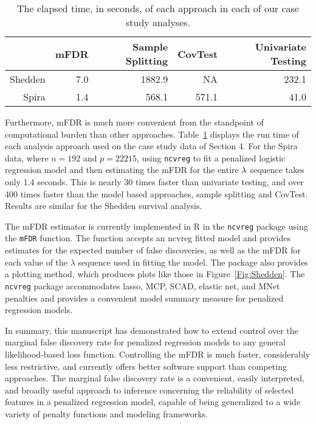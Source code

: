 \begin{table}[ht]
 \caption{\label{Tab:time} The elapsed time, in seconds, of each approach in each of our case study analyses.}
\centering
\begin{tabular}{rrrrr}
  \hline
 & mFDR & Sample Splitting & CovTest & Univariate Testing \\ 
  \hline
	Shedden & 7.0 & 1882.9 & NA & 232.1 \\
Spira & 1.4 & 568.1 & 571.1 & 41.0 \\ 
   \hline
\end{tabular}
\end{table}

Furthermore, mFDR is much more convenient from the standpoint of computational burden than other approaches.  Table~\ref{Tab:time} displays the run time of each analysis approach used on the case study data of Section 4. For the Spira data, where $n = 192$ and $p =22215$, using {\tt ncvreg} to fit a penalized logistic regression model and then estimating the mFDR for the entire $\lambda$ sequence takes only 1.4 seconds. This is nearly 30 times faster than univariate testing, and over 400 times faster than the model based approaches, sample splitting and CovTest.  Results are similar for the Shedden survival analysis.

The mFDR estimator is currently implemented in R in the {\tt ncvreg} package \citep{Breheny2011} using the {\tt mFDR} function. The function accepts an ncvreg fitted model and provides estimates for the expected number of false discoveries, as well as the mFDR for each value of the $\lambda$ sequence used in fitting the model.  The package also provides a plotting method, which produces plots like those in Figure~\ref{Fig:Shedden}.  The {\tt ncvreg} package accommodates lasso, MCP, SCAD, elastic net, and MNet \citep{Huang2016} penalties and provides a convenient model summary measure for penalized regression models.

In summary, this manuscript has demonstrated how to extend control over the marginal false discovery rate for penalized regression models to any general likelihood-based loss function.  Controlling the mFDR is much faster, considerably less restrictive, and currently offers better software support than competing approaches.  The marginal false discovery rate is a convenient, easily interpreted, and broadly useful approach to inference concerning the reliability of selected features in a penalized regression model, capable of being generalized to a wide variety of penalty functions and modeling frameworks.
